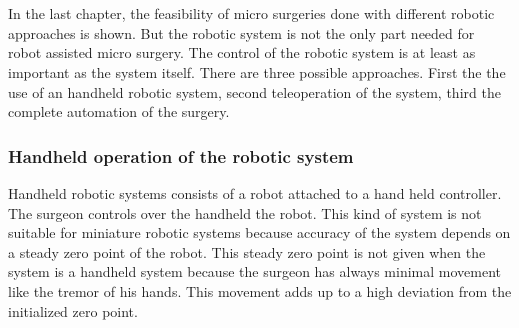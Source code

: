 \chapter{}
\label{sec:controlofroboticsystems}
In the last chapter, the feasibility of micro surgeries done with different robotic approaches is shown. But the robotic system is not the only part needed for robot assisted micro surgery. The control of the robotic system is at least as important as the system itself. There are three possible approaches. First the the use of an handheld robotic system, second teleoperation of the system, third the complete automation of the surgery. \\

\subsection{Handheld operation of the robotic system}
\label{sec:handheldoperation}
Handheld robotic systems consists of a robot attached to a hand held controller. The surgeon controls over the handheld the robot. This kind of system is not suitable for miniature robotic systems because accuracy of the system depends on a steady zero point of the robot. This steady zero point is not given when the system is a handheld system because the surgeon has always minimal movement like the tremor of his hands. This movement adds up to a high deviation from the initialized zero point.

